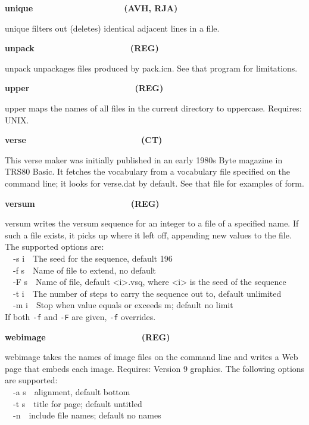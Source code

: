 {\sffamily\bfseries
unique\ \ \ \ \ \ \ \ \ \ \ \ \ \ \ \ \ \  \ (AVH, RJA)}

\textsf{unique} filters out (deletes) identical adjacent lines in a
file. 

{\sffamily\bfseries
unpack\ \ \ \ \ \ \ \ \ \ \ \ \ \ \ \ \ \ \ \ (REG)}

\textsf{unpack} unpackages files produced by \textsf{pack.icn}. See that
program for limitations. 

{\sffamily\bfseries
upper\ \ \ \ \ \ \ \ \ \ \ \ \ \ \ \ \ \ \ \ \ \ (REG)}

\textsf{upper} maps the names of all files in the current directory to
uppercase. Requires: UNIX. 

{\sffamily\bfseries
verse\ \ \ \ \ \ \ \ \ \ \ \ \ \ \ \ \ \ \ \ \ \  \ \ (CT)}

This verse maker was initially published in an early 1980s
Byte magazine in TRS80 Basic. It fetches the vocabulary from a
vocabulary file specified on the command line; it looks for
\textsf{verse.dat} by default. See that file for examples of form. 

{\sffamily\bfseries
versum\ \ \ \ \ \ \ \ \ \ \ \ \ \ \ \ \ \ \ \ (REG)}

\textsf{versum} writes the versum sequence for an integer to a file of a
specified name. If such a file exists, it picks up where it left off,
appending new values to the file. The supported options are:\\
\texttt{\ \ }\textsf{{}-s i}\ \ The seed for the sequence, default
196\\
\ \ \textsf{{}-f s}\ \ Name of file to extend, no default\\
\ \ \textsf{{}-F s}\ \ Name of file, default
{\textless}i{\textgreater}.vsq, where {\textless}i{\textgreater} is the
seed of the sequence\\
\ \ \textsf{{}-t i}\ \ The number of steps to carry the sequence out to,
default unlimited\\
\ \ \textsf{{}-m i}\ \ Stop when value equals or exceeds m; default no
limit\\
If both \texttt{{}-f} and \texttt{{}-F} are given, \texttt{{}-f}
overrides.

{\sffamily\bfseries
webimage\ \ \ \ \ \ \ \ \ \ \ \ \ \ \ \ \ \ \ \ (REG)}

\textsf{webimage} takes the names of image files on the command line and
writes a Web page that embeds each image. Requires: Version 9 graphics.
The following options are supported:\\
\ \ \textsf{{}-a s}\ \ alignment, default
{\textquotedbl}bottom{\textquotedbl}\\
\ \ \textsf{{}-t s}\ \ title for page; default
{\textquotedbl}untitled{\textquotedbl}\\
\ \ \textsf{{}-n}\ \ include file names; default no names

